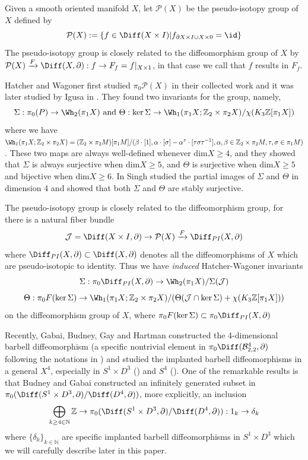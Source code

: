 
Given a smooth oriented manifold $X$, let $\mathcal{P}(X)$ be the pseudo-isotopy group of $X$ defined by 
$$\mathcal{P}(X):=\{f\in \Diff(X\times I)|f_{\partial X\times I\cup X\times{0}}=\id\}$$
The pseudo-isotopy group is closely related to the diffeomorphism group of $X$ by $\mathcal{P}(X)\xrightarrow{F} \Diff(X, \partial): f\to F_f=f|_{X\times 1}$, in that case we call that $f$ results in $F_f$.

Hatcher and Wagoner first studied $\pi_0\mathcal{P}(X)$ in their collected work \cite{AST_1973__6__1_0} and it was later studied by Igusa in \cite{K.Igusa}. They found two invariants for the group, namely, $$\Sigma: \pi_0(P)\to \Wh_2(\pi_1X)\text{ and }\Theta: \ker\Sigma\to \Wh_1(\pi_1X; \mathbb{Z}_2\times \pi_2 X)/\chi(K_3\mathbb{Z}[\pi_1 X])$$
where we have $\Wh_1(\pi_1X; \mathbb{Z}_2\times \pi_2 X)=(\mathbb{Z}_2\times \pi_2 M)[\pi_1 M]/(\beta\cdot [1], \alpha\cdot [\sigma]-\alpha^\tau\cdot [\tau\sigma\tau^{-1}], \alpha,\beta\in \mathbb{Z}_2\times \pi_2 M, \tau,\sigma\in \pi_1 M)$.  These two maps are always well-defined whenever $\text{dim}X\geq 4$, and they showed that $\Sigma$ is always surjective when $\text{dim}X\geq 5$, and $\Theta$ is surjective when $\text{dim}X\geq 5$ and bijective when $\text{dim}X\geq 6$. In \cite{singh2022pseudoisotopiesdiffeomorphisms4manifolds} Singh studied the partial images of $\Sigma$ and $\Theta$ in dimension 4 and showed that both $\Sigma$ and $\Theta$ are stably surjective.

The pseudo-isotopy group is closely related to the diffeomorphism group, for there is a natural fiber bundle 
$$\mathcal{J}=\Diff(X\times I,\partial)\to \mathcal{P}(X)\xrightarrow{F} \Diff_{PI}(X,\partial)$$
where $\Diff_{PI}(X,\partial)\subset \Diff(X,\partial) $ denotes all the diffeomorphisms of $X$ which are pseudo-isotopic to identity. Thus we have \emph{induced} Hatcher-Wagoner invariants $$\Sigma: \pi_0\Diff_{PI}(X,\partial)\to \Wh_2(\pi_1 X)/\Sigma(\mathcal{J})$$ $$\Theta: \pi_0F(\ker\Sigma)\to \Wh_1(\pi_1 X; \mathbb{Z}_2\times \pi_2 X)/(\Theta(\mathcal{J}\cap \ker\Sigma)+\chi(K_3\mathbb{Z}[\pi_1 X])) $$ on the diffeomorphism group of $X$, where $\pi_0F(\ker\Sigma)\subset \pi_0\Diff_{PI}(X,\partial)$

Recently, Gabai, Budney, Gay and Hartman constructed the 4-dimensional barbell diffeomorphism (a specific nontrivial element in $\pi_0\Diff(\mathcal{B}_{2,2}^4,\partial)$ following the notations in \cite{Budney_2025}) and studied the implanted barbell diffeomorphisms in a general $X^4$, especially in $S^1\times D^3$ (\cite{budney2021knotted3ballss4}) and $S^4$ (\cite{Gay_2025}). One of the remarkable results is that Budney and Gabai constructed an infinitely generated subset in $\pi_0(\Diff(S^1\times D^3,\partial)/\Diff(D^4,\partial))$, more explicitly, an inclusion $$\bigoplus_{k\geq 4\in \mathbb{N}} \mathbb{Z} \to  \pi_0(\Diff(S^1\times D^3,\partial)/\Diff(D^4,\partial)): 1_k\to \delta_k$$
where $\{\delta_k\}_{k\in \mathbb{N}}$ are specific implanted barbell diffeomorphisms in $S^1\times D^3$ which we will carefully describe later in this paper.

